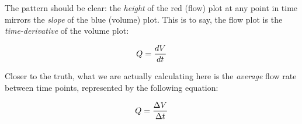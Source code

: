 





The pattern should be clear: the {\it height} of the red (flow) plot at any point in time mirrors the {\it slope} of the blue (volume) plot.  This is to say, the flow plot is the {\it time-derivative} of the volume plot:

$$Q = {dV \over dt}$$

Closer to the truth, what we are actually calculating here is the {\it average} flow rate between time points, represented by the following equation:

$$Q = {\Delta V \over \Delta t}$$




